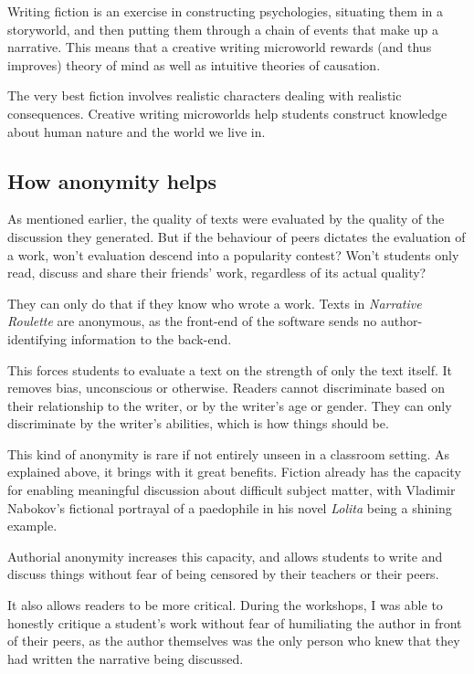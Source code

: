 Writing fiction is an exercise in constructing psychologies, situating
them in a storyworld, and then putting them through a chain of events
that make up a narrative. This means that a creative writing microworld
rewards (and thus improves) theory of mind as well as intuitive theories
of causation.

The very best fiction involves realistic characters dealing with
realistic consequences. Creative writing microworlds help students
construct knowledge about human nature and the world we live in.

\subsection{How anonymity helps}

As mentioned earlier, the quality of texts were evaluated by the quality of the discussion they generated. But if the behaviour of peers dictates the evaluation of a work, won't
evaluation descend into a popularity contest? Won't students only read,
discuss and share their friends' work, regardless of its actual quality?

They can only do that if they know who wrote a work. Texts in
\emph{Narrative Roulette} are anonymous, as the front-end of the
software sends no author-identifying information to the back-end.

This forces students to evaluate a text on the strength of only the text
itself. It removes bias, unconscious or otherwise. Readers cannot
discriminate based on their relationship to the writer, or by the
writer's age or gender. They can only discriminate by the writer's
abilities, which is how things should be.

This kind of anonymity is rare if not entirely unseen in a classroom
setting. As explained above, it brings with it great benefits. Fiction
already has the capacity for enabling meaningful discussion about difficult subject matter, with Vladimir Nabokov's fictional portrayal of a paedophile in his novel \emph{Lolita} being a shining example.

Authorial anonymity increases this capacity, and allows students to
write and discuss things without fear of being censored by their teachers or their
peers.

It also allows readers to be more critical. During the workshops, I was able to honestly critique a student's work without fear of humiliating the author in front of their peers, as the author themselves was the only person who knew that they had written the narrative being discussed.

